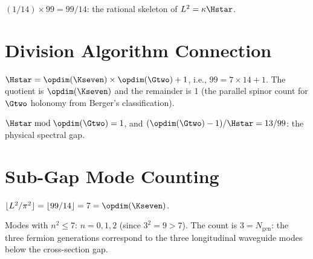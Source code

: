 \begin{theorem}[$\kappa \times \Hstar = L^2/\pi^2$]\label{thm:kappa_H_star}
    \leanok
    $(1/14) \times 99 = 99/14$: the rational skeleton of $L^2 = \kappa \Hstar$.
\end{theorem}

\section{Division Algorithm Connection}

\begin{theorem}\label{thm:euclidean_div}
    \leanok
    $\Hstar = \opdim(\Kseven) \times \opdim(\Gtwo) + 1$, i.e., $99 = 7 \times 14 + 1$.
    The quotient is $\opdim(\Kseven)$ and the remainder is 1 (the parallel spinor count
    for $\Gtwo$ holonomy from Berger's classification).
\end{theorem}

\begin{theorem}[Remainder $=$ spinor correction]\label{thm:remainder_spinor}
    \leanok
    $\Hstar \bmod \opdim(\Gtwo) = 1$, and
    $(\opdim(\Gtwo) - 1)/\Hstar = 13/99$: the physical spectral gap.
\end{theorem}

\section{Sub-Gap Mode Counting}

\begin{theorem}[Sub-gap threshold $= \opdim(\Kseven)$]\label{thm:subgap_threshold}
    \leanok
    $\lfloor L^2/\pi^2 \rfloor = \lfloor 99/14 \rfloor = 7 = \opdim(\Kseven)$.
\end{theorem}

\begin{theorem}[Sub-gap mode count $= N_{\mathrm{gen}}$]\label{thm:subgap_Ngen}
    \leanok
    Modes with $n^2 \le 7$: $n = 0, 1, 2$ (since $3^2 = 9 > 7$).
    The count is $3 = N_{\mathrm{gen}}$: the three fermion generations correspond
    to the three longitudinal waveguide modes below the cross-section gap.
\end{theorem}

